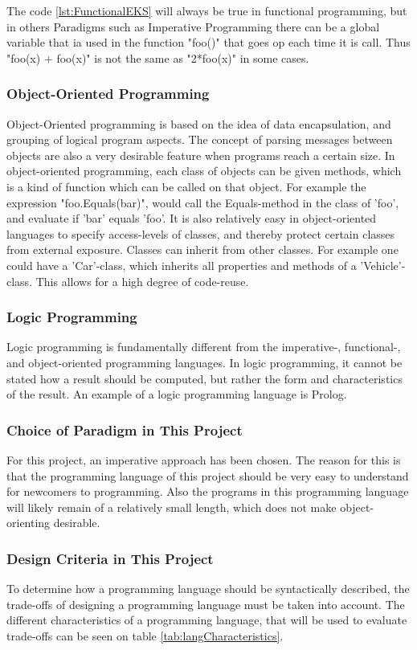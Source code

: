 The code \ref{lst:FunctionalEKS} will always be true in functional programming, but in others Paradigms such as Imperative Programming there can be a global variable that ia used in the function "foo()" that goes op each time it is call. Thus "foo(x) + foo(x)" is not the same as "2*foo(x)" in some cases.
\subsubsection{Object-Oriented Programming}
Object-Oriented programming is based on the idea of data encapsulation, and grouping of logical program aspects. The concept of parsing messages between objects are also a very desirable feature when programs reach a certain size. In object-oriented programming, each class of objects can be given methods, which is a kind of function which can be called on that object. For example the expression "foo.Equals(bar)", would call the Equals-method in the class of 'foo', and evaluate if 'bar' equals 'foo'. It is also relatively easy in object-oriented languages to specify access-levels of classes, and thereby protect certain classes from external exposure. Classes can inherit from other classes. For example one could have a 'Car'-class, which inherits all properties and methods of a 'Vehicle'-class. This allows for a high degree of code-reuse.

\subsubsection{Logic Programming}
Logic programming is fundamentally different from the imperative-, functional-, and object-oriented programming languages. In logic programming, it cannot be stated how a result should be computed, but rather the form and characteristics of the result. An example of a logic programming language is Prolog.

\subsubsection{Choice of Paradigm in This Project}
For this project, an imperative approach has been chosen. The reason for this is that the programming language of this project should be very easy to understand for newcomers to programming. Also the programs in this programming language will likely remain of a relatively small length, which does not make object-orienting desirable.

\subsubsection{Design Criteria in This Project}
To determine how a programming language should be syntactically described, the trade-offs of designing a programming language must be taken into account. The different characteristics of a programming language, that will be used to evaluate trade-offs can be seen on table \ref{tab:langCharacteristics}.

